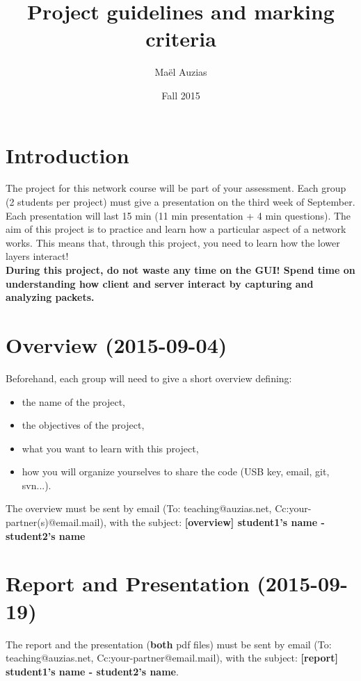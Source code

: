 \documentclass[11pt]{article}
\begin{document}
 
\title{Project guidelines and marking criteria}
\date{Fall 2015}
\author{Maël Auzias}
\maketitle

\section{Introduction}
The project for this network course will be part of your assessment. Each group (2 students per project) must give a presentation on the third week of September. Each presentation will last 15 min (11 min presentation + 4 min questions). The aim of this project is to practice and learn how a particular aspect of a network works. This means that, through this project, you need to learn how the lower layers interact!\\
\textbf{During this project, do not waste any time on the GUI! Spend time on understanding how client and server interact by capturing and analyzing packets.}

\section{Overview (2015-09-04)}
Beforehand, each group will need to give a short overview defining:
  \begin{itemize}
    \item the name of the project,
    \item the objectives of the project,
    \item what you want to learn with this project,
    \item how you will organize yourselves to share the code (USB key, email, git, svn...).
  \end{itemize}
The overview must be sent by email (To: teaching@auzias.net, Cc:your-partner(s)@email.mail), with the subject: \textbf{[overview] student1's name - student2's name}

\section{Report and Presentation (2015-09-19)}
The report and the presentation (\textbf{both} pdf files) must be sent by email (To: teaching@auzias.net, Cc:your-partner@email.mail), with the subject: \textbf{[report] student1's name - student2's name}.
\end{document}
